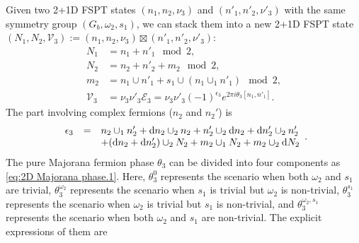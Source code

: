\documentclass[%
 reprint,
 amsmath,amssymb,
 aps,
prb,
]{revtex4-2}
\begin{document}
Given two 2+1D FSPT states $( n_{1} ,n_{2} ,\nu _{3})$ and $( n'_{1} ,n'_{2} ,\nu '_{3})$ with the same symmetry group $( G_{b} ,\omega _{2} ,s_{1})$, we can stack them into a new 2+1D FSPT state $( N_{1} ,N_{2} ,\mathcal{V}_{3}) := (n_1,n_2,\nu_3) \boxtimes (n'_1,n'_2,\nu'_3)$: 
\begin{align}
N_{1} & =  n_{1} +n'_{1} \mod 2 , \\
N_{2} & =  n_{2} +n'_{2} + m_2 \mod 2 , \\
m_{2} & =  n_{1} \cup n'_{1} +s_{1} 
\cup ( n_{1} \cup _{1} n'_{1}) \mod 2 , \\
\mathcal{V}_{3} & =  \nu _{3} \nu '_{3}\mathcal{E}_{3} = \nu _{3} \nu '_{3} ( -1)^{\epsilon _{3}} e^{2\pi i\theta _{3}[ n_{1} ,n'_{1}]} . 
\end{align}
The part involving complex fermions ($n_2$ and $n_2'$) is 
\begin{gather}
\begin{array}{ c c l }
\epsilon_{3} & = & n_{2} \cup _{1} n'_{2} +\mathrm{d} n_{2} \cup _{2} n_{2} +n'_{2} \cup _{2}\mathrm{d} n_{2} +\mathrm{d} n'_{2} \cup _{2} n'_{2}\\
 &  &+(\mathrm{d} n_{2} +\mathrm{d} n'_{2}) \cup _{2} N_{2} +m_{2} \cup _{1} N_{2} +m_{2} \cup _{2}\mathrm{d} N_{2}
\end{array} .
\end{gather}
The pure Majorana fermion phase $\theta _{3}$ can be divided into four components as \eqref{eq:2D Majorana phase.1}. Here, $\theta _{3}^{0}$ represents the scenario when both $\omega_{2}$ and $s_{1}$ are trivial, $\theta _{3}^{\omega _{2}}$ represents the scenario when $s_{1}$ is trivial but $\omega_{2}$ is non-trivial, $\theta _{3}^{s_{1}}$ represents the scenario when $\omega_{2}$ is trivial but $s_{1}$ is non-trivial, and $\theta _{3}^{\omega _{2} ,s_{1}}$ represents the scenario when both $\omega_{2}$ and $s_{1}$ are non-trivial. The explicit expressions of them are
\end{document}
